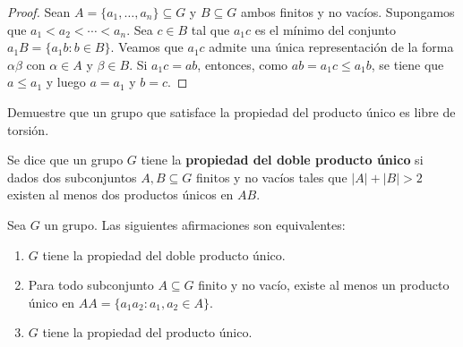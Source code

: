 \begin{proof}
	Sean $A=\{a_1,\dots,a_n\}\subseteq G$ y $B\subseteq G$ ambos finitos y no
	vacíos. Supongamos que $a_1<a_2<\cdots<a_n$. Sea $c\in B$ tal que $a_1c$ es
	el mínimo del conjunto $a_1B=\{a_1b:b\in B\}$. Veamos que $a_1c$ admite una
	única representación de la forma $\alpha\beta$ con $\alpha\in A$ y
	$\beta\in B$. Si $a_1c=ab$, entonces, como $ab=a_1c\leq a_1b$, se tiene que
	$a\leq a_1$ y luego $a=a_1$ y $b=c$. 
\end{proof}

\begin{exercise}
	Demuestre que un grupo que satisface la propiedad del producto único es
	libre de torsión.
\end{exercise}

\begin{definition}
	Se dice que un grupo $G$ tiene la \textbf{propiedad del doble producto
	único} si dados dos subconjuntos $A,B\subseteq G$ finitos y no vacíos tales
	que $|A|+|B|>2$ existen al menos dos productos únicos en $AB$.
\end{definition}

\begin{theorem}[Strojnowski]
	\label{theorem:Strojnowski}
	Sea $G$ un grupo. Las siguientes afirmaciones son equivalentes:
	\begin{enumerate}
		\item $G$ tiene la propiedad del doble producto único.
		\item Para todo subconjunto $A\subseteq G$ finito y no vacío, existe al
			menos un producto único en $AA=\{a_1a_2:a_1,a_2\in A\}$.
		\item $G$ tiene la propiedad del producto único.
	\end{enumerate}
\end{theorem}

